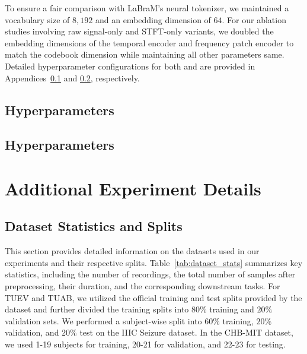 To ensure a fair comparison with LaBraM's neural tokenizer, we maintained a vocabulary size of $8,192$ and an embedding dimension of $64$. For our ablation studies involving raw signal-only and STFT-only variants, we doubled the embedding dimensions of the temporal encoder and frequency patch encoder to match the codebook dimension while maintaining all other parameters same. Detailed hyperparameter configurations for both \tokenizer and \encoder are provided in Appendices~\ref{app:tfmtokenizer_hyperparams} and \ref{app:encoder_hyperparams}, respectively.


\subsection{\tokenizer Hyperparameters}
\label{app:tfmtokenizer_hyperparams}


\newpage
\subsection{\encoder Hyperparameters}
\label{app:encoder_hyperparams}






\section{Additional Experiment Details}
\label{app:experiment_details}
\subsection{Dataset Statistics and Splits}
\label{app:dataset_splits}

This section provides detailed information on the datasets used in our experiments and their respective splits. Table~\ref{tab:dataset_stats} summarizes key statistics, including the number of recordings, the total number of samples after preprocessing, their duration, and the corresponding downstream tasks. For TUEV and TUAB, we utilized the official training and test splits provided by the dataset and further divided the training splits into $80\%$ training and $20\%$ validation sets. We performed a subject-wise split into $60\%$ training, $20\%$ validation, and $20\%$ test on the IIIC Seizure dataset. In the CHB-MIT dataset, we used 1-19 subjects for training, 20-21 for validation, and 22-23 for testing.  




